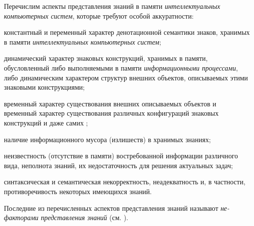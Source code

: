 Перечислим аспекты представления знаний в памяти \textit{интеллектуальных компьютерных систем}, которые требуют особой аккуратности:
\begin{textitemize}
	\item константный и переменный характер денотационной семантики знаков, хранимых в памяти \textit{интеллектуальных компьютерных систем};
	\item динамический характер знаковых конструкций, хранимых в памяти, обусловленный либо выполняемыми в памяти \textit{информационными процессами}, либо динамическим характером структур внешних объектов, описываемых этими знаковыми конструкциями;
	\item временный характер существования внешних описываемых объектов и временный характер существования различных конфигураций знаковых конструкций и даже самих ;
	\item наличие информационного мусора (излишеств) в хранимых знаниях;
	\item неизвестность (отсутствие в памяти) востребованной информации различного вида, неполнота знаний, их недостаточность для решения актуальных задач;
	\item синтаксическая и семантическая некорректность, неадекватность и,  в частности, противоречивость некоторых имеющихся знаний.
\end{textitemize}

Последние из перечисленных аспектов представления знаний называют \textit{не-факторами представления знаний} (см. \cite{Narinjani2000}).


%